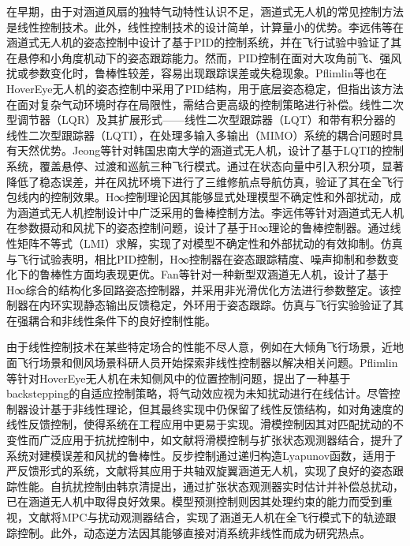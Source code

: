 在早期，由于对涵道风扇的独特气动特性认识不足，涵道式无人机的常见控制方法是线性控制技术。此外，线性控制技术的设计简单，计算量小的优势。李远伟等在涵道式无人机的姿态控制中设计了基于PID的控制系统，并在飞行试验中验证了其在悬停和小角度机动下的姿态跟踪能力\cite{li2010robust}。然而，PID控制在面对大攻角前飞、强风扰或参数变化时，鲁棒性较差，容易出现跟踪误差或失稳现象。Pflimlin等也在HoverEye无人机的姿态控制中采用了PID结构，用于底层姿态稳定，但指出该方法在面对复杂气动环境时存在局限性，需结合更高级的控制策略进行补偿\cite{pflimlin2007position}。线性二次型调节器（LQR）及其扩展形式——线性二次型跟踪器（LQT）和带有积分器的线性二次型跟踪器（LQTI），在处理多输入多输出（MIMO）系统的耦合问题时具有天然优势。Jeong等针对韩国忠南大学的涵道式无人机，设计了基于LQTI的控制系统，覆盖悬停、过渡和巡航三种飞行模式\cite{jeong2015control}。通过在状态向量中引入积分项，显著降低了稳态误差，并在风扰环境下进行了三维修航点导航仿真，验证了其在全飞行包线内的控制效果。H∞控制理论因其能够显式处理模型不确定性和外部扰动，成为涵道式无人机控制设计中广泛采用的鲁棒控制方法。李远伟等针对涵道式无人机在参数摄动和风扰下的姿态控制问题，设计了基于H∞理论的鲁棒控制器。通过线性矩阵不等式（LMI）求解，实现了对模型不确定性和外部扰动的有效抑制。仿真与飞行试验表明，相比PID控制，H∞控制器在姿态跟踪精度、噪声抑制和参数变化下的鲁棒性方面均表现更优\cite{li2010robust}。Fan等针对一种新型双涵道无人机，设计了基于H∞综合的结构化多回路姿态控制器，并采用非光滑优化方法进行参数整定。该控制器在内环实现静态输出反馈稳定，外环用于姿态跟踪。仿真与飞行实验验证了其在强耦合和非线性条件下的良好控制性能\cite{fan2018modelling}。

由于线性控制技术在某些特定场合的性能不尽人意，例如在大倾角飞行场景，近地面飞行场景和侧风场景科研人员开始探索非线性控制器以解决相关问题。Pflimlin等针对HoverEye无人机在未知侧风中的位置控制问题，提出了一种基于backstepping的自适应控制策略，将气动效应视为未知扰动进行在线估计。尽管控制器设计基于非线性理论，但其最终实现中仍保留了线性反馈结构，如对角速度的线性反馈控制，使得系统在工程应用中更易于实现\cite{pflimlin2007position}。滑模控制因其对匹配扰动的不变性而广泛应用于抗扰控制中，如文献\cite{manzoor2022composite}将滑模控制与扩张状态观测器结合，提升了系统对建模误差和风扰的鲁棒性。反步控制通过递归构造Lyapunov函数，适用于严反馈形式的系统，文献\cite{ai2025robust}将其应用于共轴双旋翼涵道无人机，实现了良好的姿态跟踪性能。自抗扰控制由韩京清提出，通过扩张状态观测器实时估计并补偿总扰动，已在涵道无人机中取得良好效果\cite{chen2024ADRC}。模型预测控制则因其处理约束的能力而受到重视，文献\cite{Manzoor2020VTOL, manzoor2022composite}将MPC与扰动观测器结合，实现了涵道无人机在全飞行模式下的轨迹跟踪控制。此外，动态逆方法因其能够直接对消系统非线性而成为研究热点\cite{zhu1997NDI, zhang2015NDI}。

